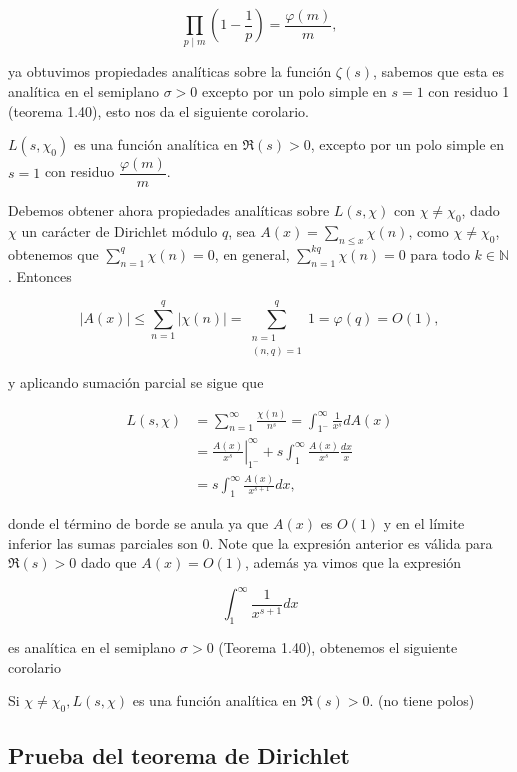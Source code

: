 $$\prod_{p \mid m}\left(1-\frac{1}{p}\right)=\frac{\varphi(m)}{m},$$

ya obtuvimos propiedades analíticas sobre la función $\zeta(s)$, sabemos que esta es analítica en el semiplano $\sigma>0$ excepto por un polo simple en $s=1$ con residuo 1 (teorema 1.40), esto nos da el siguiente corolario.

\begin{corollary}
$L\left(s, \chi_0\right)$ es una función analítica en $\Re(s)>0$, excepto por un polo simple en $s=1$ con residuo $\dfrac{\varphi(m)}{m}$.
\end{corollary}

Debemos obtener ahora propiedades analíticas sobre $L(s,\chi)$ con $\chi\neq \chi_0$, dado $\chi$ un carácter de Dirichlet módulo $q$, sea $A(x)=\displaystyle\sum_{n \leq x} \chi(n)$, como $\chi\neq \chi_0$, obtenemos que $\displaystyle\sum_{n=1}^q \chi(n)=0$, en general, $\displaystyle\sum_{n=1}^{k q} \chi(n)=0$ para todo $k \in \mathbb{N}$. Entonces

$$
|A(x)| \leq \sum_{n=1}^q|\chi(n)|=\sum_{\substack{n=1 \\(n, q)=1}}^q 1=\varphi(q)=O(1),
$$

y aplicando sumación parcial se sigue que

$$\begin{aligned}
L(s, \chi) & =\sum_{n=1}^{\infty} \frac{\chi(n)}{n^s}=\int_{1^{-}}^{\infty} \frac{1}{x^s} d A(x) \\
& =\left.\frac{A(x)}{x^s}\right|_{1^{-}} ^{\infty}+s \int_{1}^{\infty} \frac{A(x)}{x^s} \frac{d x}{x} \\
& =s \int_{1}^{\infty} \frac{A(x)}{x^{s+1}} d x ,
\end{aligned}$$



donde el término de borde se anula ya que $A(x)$ es $O(1)$ y en el límite inferior las sumas parciales son 0. Note que la expresión anterior es válida para $\Re(s)>0$ dado que $A(x)=O(1)$, además ya vimos que la expresión

$$\int_1^{\infty}\frac{1}{x^{s+1}}dx$$

es analítica en el semiplano $\sigma>0$ (Teorema 1.40), obtenemos el siguiente corolario
\begin{corollary}
Si $\chi \neq \chi_0, L(s, \chi)$ es una función analítica en $\Re(s)>0$. (no tiene polos)
\end{corollary}

\subsection{Prueba del teorema de Dirichlet}

